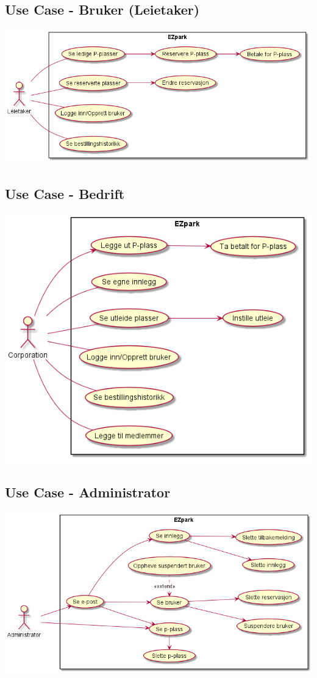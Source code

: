 \documentclass[12pt]{article}
\begin{document}
    \subsection{Use Case - Bruker (Leietaker)}
    \includegraphics[scale=0.6]{bilder/diagrammer/uc_leietaker.png}\\
    
    \subsection{Use Case - Bedrift}
    \includegraphics[scale=0.75]{bilder/diagrammer/uc_corp.png}\\

    \subsection{Use Case - Administrator}
    \includegraphics[scale=0.6]{bilder/diagrammer/uc_admin.png}\\
    
\end{document}
